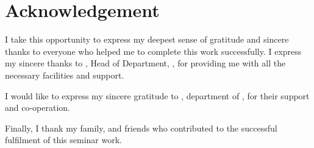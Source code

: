 \chapter*{Acknowledgement}%
%



I take this opportunity to express my deepest sense of gratitude and sincere thanks to everyone who helped me to complete this work successfully. I express my sincere thanks to \textbf{ \hod}, Head of Department, \dept, \college\hspace*{2pt} \collegeplace \hspace*{2pt} for providing  me with all the necessary facilities and support.\par

 I would like to express my sincere gratitude to \textbf{\guide}, \hspace*{2pt} department of \hspace*{2pt} \dept, \hspace*{2pt} \college \hspace*{2pt} \collegeplace \hspace*{2pt} for their support and co-operation.


Finally, I thank my family, and friends who contributed to the successful fulfilment of this seminar work.

\vspace*{30pt}
\begin{flushright}
	\textbf{\author}
\end{flushright}
\thispagestyle{plain}
